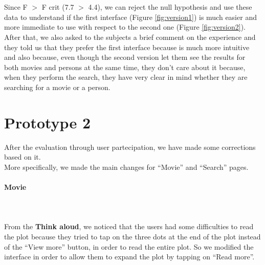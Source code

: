 \documentclass[12pt, a4paper]{article}
\numberwithin{figure}{section}
\begin{document}
\noindent\mbox{}\\\\
Since F $>$ F crit (7.7 $>$ 4.4), we can reject the null hypothesis and use these data to understand 
if the first interface (Figure \ref{fig:version1}) is much easier and more immediate to use with respect to the second 
one (Figure \ref{fig:version2}).\\
After that, we also asked to the subjects a brief comment on the experience and they told us 
that they prefer the first interface because is much more intuitive and also because, even though the 
second version let them see the results for both movies and persons at the same time, they don't care 
about it because, when they perform the search, they have very clear in  mind whether they are searching 
for a movie or a person.



\newpage

\section{Prototype 2}

After the evaluation through user partecipation, we have made some corrections based on it.\\
More specifically, we made the main changes for “Movie” and “Search” pages.

\paragraph{Movie}\mbox{}\\\\
From the \textbf{Think aloud}, we noticed that the users had some difficulties to read the plot because
they tried to tap on the three dots at the end of the plot instead of the “View more” button, 
in order to read the entire plot. So we modified the interface in order to allow them to expand the 
plot by tapping on “Read more”.
\end{document}
